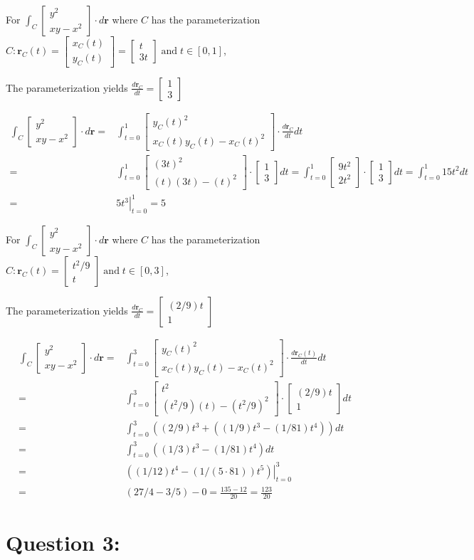 \documentclass{article}
\newcommand{\colxyvec}[2]{\begin{bmatrix} #1 \\ #2 \end{bmatrix}}
\newcommand{\at}[1]{\left. #1 \right|}
\newcommand{\dr}[1]{\textcolor{dark_red}{#1}}
\begin{document}
\begin{framed}
\dr{For \(\int_C \colxyvec{y^2}{xy - x^2} \cdot d\mathbf{r}\) where \(C\) has the parameterization \(C: \mathbf{r}_C(t) = \colxyvec{x_C(t)}{y_C(t)} = \colxyvec{t}{3t} \;\text{and}\; t \in [0,1]\),}

\dr{The parameterization yields \(\frac{d\mathbf{r}_C}{dt} = \colxyvec{1}{3}\)}

\dr{\begin{align*}
\int_C \colxyvec{y^2}{xy - x^2} \cdot d\mathbf{r} = & \int_{t=0}^1 \colxyvec{y_C(t)^2}{x_C(t)y_C(t) - x_C(t)^2} \cdot \frac{d\mathbf{r}_C}{dt}dt \\
= & \int_{t = 0}^1 \colxyvec{(3t)^2}{(t)(3t) - (t)^2} \cdot \colxyvec{1}{3}dt 
= \int_{t = 0}^1 \colxyvec{9t^2}{2t^2} \cdot \colxyvec{1}{3}dt 
= \int_{t = 0}^1 15t^2 dt \\
= & \at{5t^3}_{t=0}^1 
= 5
\end{align*}}
\end{framed}

\pagebreak

\begin{framed}
\dr{For \(\int_C \colxyvec{y^2}{xy - x^2} \cdot d\mathbf{r}\) where \(C\) has the parameterization \(C: \mathbf{r}_C(t) = \colxyvec{t^2/9}{t} \;\text{and}\; t \in [0,3]\),}

\dr{The parameterization yields \(\frac{d\mathbf{r}_C}{dt} = \colxyvec{(2/9)t}{1}\)}

\dr{\begin{align*}
\int_C \colxyvec{y^2}{xy - x^2} \cdot d\mathbf{r} = & \int_{t = 0}^3 \colxyvec{y_C(t)^2}{x_C(t)y_C(t) - x_C(t)^2} \cdot \frac{d\mathbf{r}_C(t)}{dt}dt \\
= & \int_{t = 0}^3 \colxyvec{t^2}{(t^2/9)(t) - (t^2/9)^2} \cdot \colxyvec{(2/9)t}{1}dt \\
= & \int_{t = 0}^3 ((2/9)t^3 + ((1/9)t^3 - (1/81)t^4))dt \\
= & \int_{t = 0}^3 ((1/3)t^3 - (1/81)t^4)dt \\
= & \at{((1/12)t^4 - (1/(5 \cdot 81))t^5)}_{t = 0}^3 \\
= & (27/4 - 3/5) - 0 
= \frac{135 - 12}{20} = \frac{123}{20}
\end{align*}}
\end{framed}




\section*{Question 3:}
\end{document}
